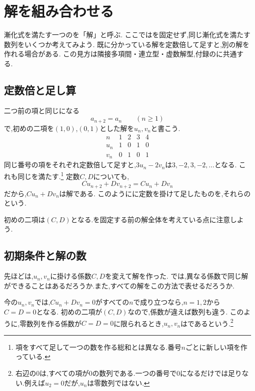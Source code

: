 
\section{解を組み合わせる}\label{節：解を組み合わせる見方}
  漸化式を満たす一つのを「解」と呼ぶ.
  ここではを固定せず,同じ漸化式を満たす数列をいくつか考えてみよう.
  既に分かっている解を定数倍して足すと,別の解を作れる場合がある.
  この見方は隣接多項間・連立型・虚数解型,付録のに共通する.

  \subsection{定数倍と足し算}\label{節：線形結合}
    二つ前の項と同じになる
    \[
      a_{n+2}=a_n\qquad(n\ge1)
    \]
    で,初めの二項を$(1,0)$,$(0,1)$とした解を$u_n,v_n$と書こう.
    \[
      \begin{array}{c|rrrr}
        n&1&2&3&4\\ \hline
        u_n&1&0&1&0\\
        v_n&0&1&0&1
      \end{array}
    \]
    同じ番号の項をそれぞれ定数倍して足すと,$3u_n-2v_n$は$3,-2,3,-2,\ldots$となる.
    これも同じを満たす.\footnote{項をすべて足して一つの数を作る総和とは異なる.番号$n$ごとに新しい項を作っている.}
    定数$C,D$についても,
    \[
      Cu_{n+2}+Dv_{n+2}=Cu_n+Dv_n
    \]
    だから,$Cu_n+Dv_n$は解である.
    このようにに定数を掛けて足したものを,それらの\textbf{}という.

    初めの二項は$(C,D)$となる.を固定する前の解全体を考えている点に注意しよう.

  \subsection{初期条件と解の数}\label{節：一次独立・基底・次元}
    先ほどは,$u_n,v_n$に掛ける係数$C,D$を変えて解を作った.
    では,異なる係数で同じ解ができることはあるだろうか.また,すべての解をこの方法で表せるだろうか.

    今の$u_n,v_n$では,$Cu_n+Dv_n=0$がすべての$n$で成り立つなら,$n=1,2$から$C=D=0$となる.
    初めの二項が$(C,D)$なので,係数が違えば数列も違う.
    このように,零数列を作る係数が$C=D=0$に限られるとき,$u_n,v_n$は\textbf{}であるという.\footnote{右辺の$0$は,すべての項が$0$の数列である.一つの番号で$0$になるだけでは足りない.例えば$u_2=0$だが,$u_n$は零数列ではない.}

